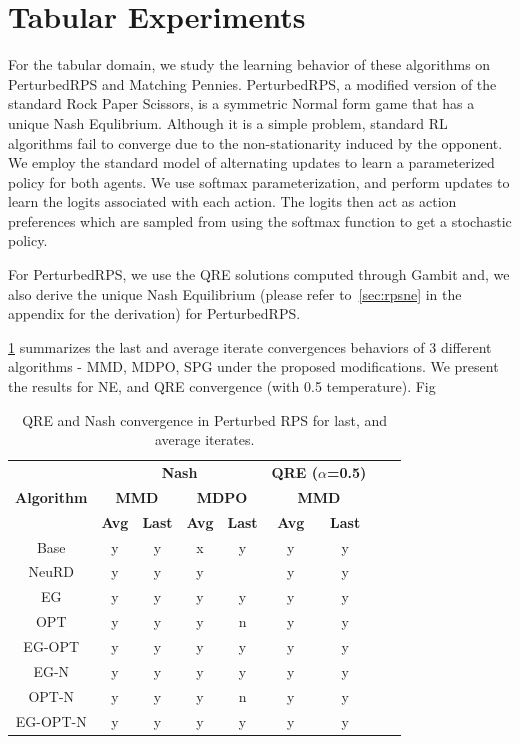 
\section{Tabular Experiments}
For the tabular domain, we study the learning behavior of these algorithms on
PerturbedRPS and Matching Pennies. 
PerturbedRPS, a modified version of the standard Rock Paper Scissors, is a symmetric Normal form game 
that has a unique Nash Equlibrium.
Although it is a simple problem, standard RL algorithms fail to converge due to the non-stationarity 
induced by the opponent.
We employ the standard model of alternating updates to learn a parameterized policy for both agents. 
We use softmax parameterization, and perform updates to learn the logits associated with each action. 
The logits then act as action preferences which are sampled from using the softmax function to get a stochastic policy.

For PerturbedRPS, we use the QRE solutions computed through Gambit and, we also derive the unique
Nash Equilibrium (please refer to~\ref{sec:rpsne} in the appendix for the derivation) for
PerturbedRPS.\

\ref{tab:tabres} summarizes the last and average iterate convergences behaviors of 3 different algorithms -
MMD, MDPO, SPG under the proposed modifications.
We present the results for NE, and QRE convergence (with 0.5 temperature). Fig


\begin{table}[htbp]
	\centering
	\begin{tabular}{|c|c|c|c|c|c|c|c|c|}
	\hline
	\multirow{3}{*}{\textbf{Algorithm}} &
	\multicolumn{4}{c|}{\textbf{Nash}} &
	\multicolumn{2}{c|}{\textbf{QRE ($\alpha$=0.5)}} \\
	\cline{2-7}
	& 
	\multicolumn{2}{c|}{\textbf{MMD}} & 
	\multicolumn{2}{c|}{\textbf{MDPO}} &
	\multicolumn{2}{c|}{\textbf{MMD}} \\
	\cline{2-7}
	& \textbf{Avg} & \textbf{Last} & \textbf{Avg} & \textbf{Last}
	& \textbf{Avg} & \textbf{Last} \\
	\hline
	Base	 	& y & y & x & y 		& y & y \\
	\hline
	NeuRD 		& y & y & y & \red{x} 	& y & y \\
	\hline
	EG 			& y & y & y & y 	& y & y \\
	\hline
	OPT 		& y & y & y & n 	& y & y \\
	\hline
	EG-OPT 		& y & y & y & y 	& y & y \\
	\hline
	EG-N 		& y & y & y & y 	& y & y \\
	\hline
	OPT-N 		& y & y & y & n 	& y & y \\
	\hline
	EG-OPT-N	& y & y & y & y 	& y & y \\
	\hline
	\end{tabular}
	\caption{QRE and Nash convergence in Perturbed RPS for last, and average iterates.}
	\label{tab:tabres}
\end{table}

